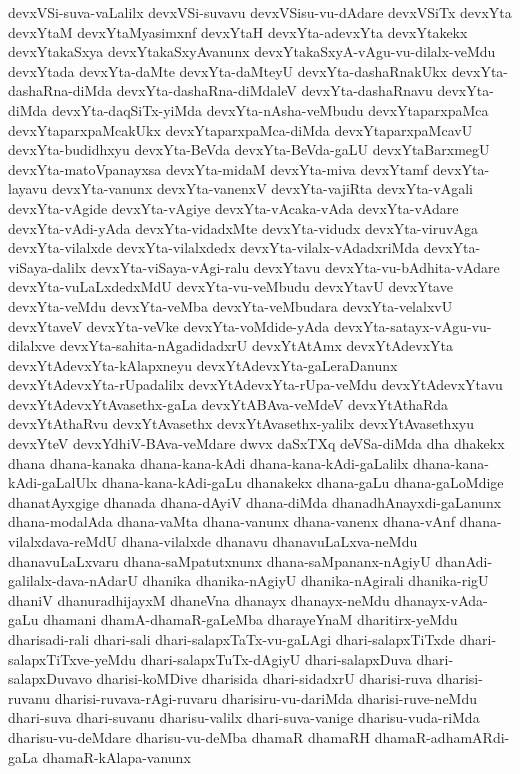 {devxVSi-suva-vaLalilx
devxVSi-suvavu
devxVSisu-vu-dAdare
devxVSiTx
devxYta
devxYtaM
devxYtaMyasimxnf
devxYtaH
devxYta-adevxYta
devxYtakekx
devxYtakaSxya
devxYtakaSxyAvanunx
devxYtakaSxyA-vAgu-vu-dilalx-veMdu
devxYtada
devxYta-daMte
devxYta-daMteyU
devxYta-dashaRnakUkx
devxYta-dashaRna-diMda
devxYta-dashaRna-diMdaleV
devxYta-dashaRnavu
devxYta-diMda
devxYta-daqSiTx-yiMda
devxYta-nAsha-veMbudu
devxYtaparxpaMca
devxYtaparxpaMcakUkx
devxYtaparxpaMca-diMda
devxYtaparxpaMcavU
devxYta-budidhxyu
devxYta-BeVda
devxYta-BeVda-gaLU
devxYtaBarxmegU
devxYta-matoVpanayxsa
devxYta-midaM
devxYta-miva
devxYtamf
devxYta-layavu
devxYta-vanunx
devxYta-vanenxV
devxYta-vajiRta
devxYta-vAgali
devxYta-vAgide
devxYta-vAgiye
devxYta-vAcaka-vAda
devxYta-vAdare
devxYta-vAdi-yAda
devxYta-vidadxMte
devxYta-vidudx
devxYta-viruvAga
devxYta-vilalxde
devxYta-vilalxdedx
devxYta-vilalx-vAdadxriMda
devxYta-viSaya-dalilx
devxYta-viSaya-vAgi-ralu
devxYtavu
devxYta-vu-bAdhita-vAdare
devxYta-vuLaLxdedxMdU
devxYta-vu-veMbudu
devxYtavU
devxYtave
devxYta-veMdu
devxYta-veMba
devxYta-veMbudara
devxYta-velalxvU
devxYtaveV
devxYta-veVke
devxYta-voMdide-yAda
devxYta-satayx-vAgu-vu-dilalxve
devxYta-sahita-nAgadidadxrU
devxYtAtAmx
devxYtAdevxYta
devxYtAdevxYta-kAlapxneyu
devxYtAdevxYta-gaLeraDanunx
devxYtAdevxYta-rUpadalilx
devxYtAdevxYta-rUpa-veMdu
devxYtAdevxYtavu
devxYtAdevxYtAvasethx-gaLa
devxYtABAva-veMdeV
devxYtAthaRda
devxYtAthaRvu
devxYtAvasethx
devxYtAvasethx-yalilx
devxYtAvasethxyu
devxYteV
devxYdhiV-BAva-veMdare
dwvx
daSxTXq
deVSa-diMda
dha
dhakekx
dhana
dhana-kanaka
dhana-kana-kAdi
dhana-kana-kAdi-gaLalilx
dhana-kana-kAdi-gaLalUlx
dhana-kana-kAdi-gaLu
dhanakekx
dhana-gaLu
dhana-gaLoMdige
dhanatAyxgige
dhanada
dhana-dAyiV
dhana-diMda
dhanadhAnayxdi-gaLanunx
dhana-modalAda
dhana-vaMta
dhana-vanunx
dhana-vanenx
dhana-vAnf
dhana-vilalxdava-reMdU
dhana-vilalxde
dhanavu
dhanavuLaLxva-neMdu
dhanavuLaLxvaru
dhana-saMpatutxnunx
dhana-saMpananx-nAgiyU
dhanAdi-galilalx-dava-nAdarU
dhanika
dhanika-nAgiyU
dhanika-nAgirali
dhanika-rigU
dhaniV
dhanuradhijayxM
dhaneVna
dhanayx
dhanayx-neMdu
dhanayx-vAda-gaLu
dhamani
dhamA-dhamaR-gaLeMba
dharayeYnaM
dharitirx-yeMdu
dharisadi-rali
dhari-sali
dhari-salapxTaTx-vu-gaLAgi
dhari-salapxTiTxde
dhari-salapxTiTxve-yeMdu
dhari-salapxTuTx-dAgiyU
dhari-salapxDuva
dhari-salapxDuvavo
dharisi-koMDive
dharisida
dhari-sidadxrU
dharisi-ruva
dharisi-ruvanu
dharisi-ruvava-rAgi-ruvaru
dharisiru-vu-dariMda
dharisi-ruve-neMdu
dhari-suva
dhari-suvanu
dharisu-valilx
dhari-suva-vanige
dharisu-vuda-riMda
dharisu-vu-deMdare
dharisu-vu-deMba
dhamaR
dhamaRH
dhamaR-adhamARdi-gaLa
dhamaR-kAlapa-vanunx
}
